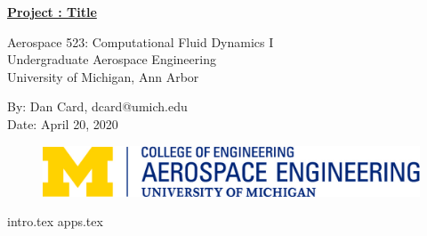 \documentclass[12pt]{extarticle}
\begin{document}
    \thispagestyle{empty}
    \begin{center}
        \textbf{{\LARGE{\underline{Project : Title}}}}

        \vspace{0.25cm}
        Aerospace 523: Computational Fluid Dynamics I
        \\ Undergraduate Aerospace Engineering
        \\ University of Michigan, Ann Arbor
        
        \vspace{0.25cm}
        By: Dan Card, dcard@umich.edu
        \\ Date: April 20, 2020
    \end{center}

    \pagebreak
    {
        \begin{figure}[h]
            \includegraphics[width=\linewidth]{rep/aero.jpg}
        \end{figure}

        \tableofcontents
        \pagebreak
        \listoffigures
        \lstlistoflistings
        \thispagestyle{empty}
    }


    {intro.tex}
    {apps.tex}
\end{document}
